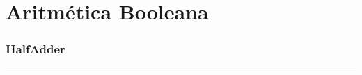 \documentclass[12pt]{article}
\begin{document}
\begin{comment}
\subsection{Esquema del circuito exterior}
\begin{figure}[H]
	\centering
	\texttt{[image: CIRCUITOS/EXT/Or8Way\_ext.png]}            \caption{Circuito exterior de Or8Way \cite{circuitverse}}
	\label{fig:or8way_ext}
\end{figure}
\subsection{Implementación HDL}
\begin{figure}[H]
	\centering
	\texttt{[image: CIRCUITOS//HDL/or8way.png]}
	\caption{Test en Hardware Simulator de Or8Way \cite{nand2tetris}}
	\label{fig:hdlor8way}
\end{figure}
\subsubsection{Archivo HDL}
\begin{lstlisting}
	CHIP Or8Way {
		IN in[8];
		OUT out;

		PARTS:
		Or(a=in[0], b=in[1],     out=a);
		Or(a=a,     b=in[2],     out=b);
		Or(a=b,     b=in[3],     out=c);
		Or(a=c,     b=in[4],     out=d);
		Or(a=d,     b=in[5],     out=e);
		Or(a=e,     b=in[6],     out=f);
		Or(a=f,     b=in[7],     out=out);
	}
\end{lstlisting}
\newpage
\end{comment}
\part{Aritmética Booleana}
\section{HalfAdder}
\hrule
\vspace{0.5cm}
\end{document}
